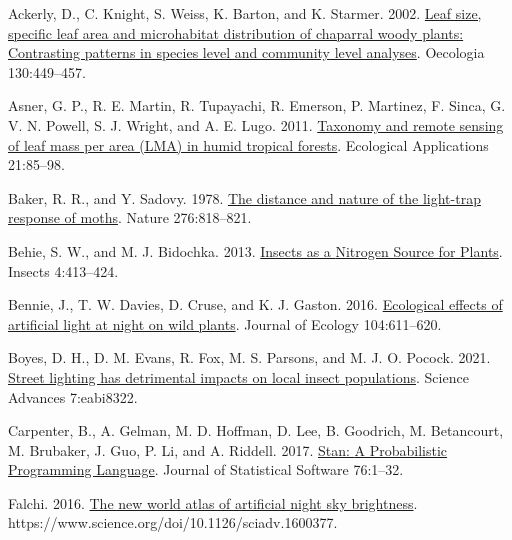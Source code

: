 \documentclass[
  12pt,
  letterpaper,
  DIV=11,
  numbers=noendperiod]{scrartcl}
\newlength{\cslhangindent}
\newlength{\cslentryspacingunit} %
\newenvironment{CSLReferences}[2] %
 {%
  \setlength{\parindent}{0pt}
  \ifodd #1
  \let\oldpar\par
  \def\par{\hangindent=\cslhangindent\oldpar}
  \fi
  \setlength{\parskip}{#2\cslentryspacingunit}
 }%
 {}
\begin{document}
\hypertarget{refs}{}
\begin{CSLReferences}{1}{0}
\leavevmode{}%
Ackerly, D., C. Knight, S. Weiss, K. Barton, and K. Starmer. 2002.
\href{https://doi.org/10.1007/s004420100805}{Leaf size, specific leaf
area and microhabitat distribution of chaparral woody plants:
Contrasting patterns in species level and community level analyses}.
Oecologia 130:449--457.

\leavevmode{}%
Asner, G. P., R. E. Martin, R. Tupayachi, R. Emerson, P. Martinez, F.
Sinca, G. V. N. Powell, S. J. Wright, and A. E. Lugo. 2011.
\href{https://doi.org/10.1890/09-1999.1}{Taxonomy and remote sensing of
leaf mass per area ({LMA}) in humid tropical forests}. Ecological
Applications 21:85--98.

\leavevmode{}%
Baker, R. R., and Y. Sadovy. 1978.
\href{https://doi.org/10.1038/276818a0}{The distance and nature of the
light-trap response of moths}. Nature 276:818--821.

\leavevmode{}%
Behie, S. W., and M. J. Bidochka. 2013.
\href{https://doi.org/10.3390/insects4030413}{Insects as a {Nitrogen
Source} for {Plants}}. Insects 4:413--424.

\leavevmode{}%
Bennie, J., T. W. Davies, D. Cruse, and K. J. Gaston. 2016.
\href{https://doi.org/10.1111/1365-2745.12551}{Ecological effects of
artificial light at night on wild plants}. Journal of Ecology
104:611--620.

\leavevmode{}%
Boyes, D. H., D. M. Evans, R. Fox, M. S. Parsons, and M. J. O. Pocock.
2021. \href{https://doi.org/10.1126/sciadv.abi8322}{Street lighting has
detrimental impacts on local insect populations}. Science Advances
7:eabi8322.

\leavevmode{}%
Carpenter, B., A. Gelman, M. D. Hoffman, D. Lee, B. Goodrich, M.
Betancourt, M. Brubaker, J. Guo, P. Li, and A. Riddell. 2017.
\href{https://doi.org/10.18637/jss.v076.i01}{Stan: {A Probabilistic
Programming Language}}. Journal of Statistical Software 76:1--32.

\leavevmode{}%
Falchi. 2016. \href{https://doi.org/10.1126/sciadv.1600377}{The new
world atlas of artificial night sky brightness}.
https://www.science.org/doi/10.1126/sciadv.1600377.


\end{CSLReferences}
\end{document}
